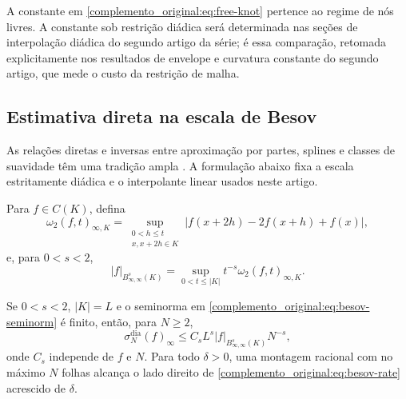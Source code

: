 A constante em \eqref{complemento_original:eq:free-knot} pertence ao regime de nós livres. A
constante sob restrição diádica será determinada nas seções de interpolação diádica do segundo artigo da série; é essa comparação, retomada explicitamente nos resultados de envelope e curvatura constante do segundo artigo, que mede o
custo da restrição de malha.

\subsection{Estimativa direta na escala de Besov}

As relações diretas e inversas entre aproximação por partes, splines e classes
de suavidade têm uma tradição ampla
\citep{artigo_2-birman1967,artigo_2-petrushev1988,artigo_2-devorepopov1988}. A formulação abaixo fixa a
escala estritamente diádica e o interpolante linear usados neste artigo.

Para $f\in C(K)$, defina
\begin{equation}
 \omega_2(f,t)_{\infty,K}
 =\sup_{\substack{0<h\le t\\x,x+2h\in K}}
 |f(x+2h)-2f(x+h)+f(x)|,
\end{equation}
e, para $0<s<2$,
\begin{equation}
 |f|_{B^s_{\infty,\infty}(K)}
 =\sup_{0<t\le|K|}t^{-s}\omega_2(f,t)_{\infty,K}.
 \label{complemento_original:eq:besov-seminorm}
\end{equation}

\begin{theorem}\label{map:complemento_original:6.3}\label{complemento_original:thm:besov}
Se $0<s<2$, $|K|=L$ e o seminorma em \eqref{complemento_original:eq:besov-seminorm} é finito, então, para $N\ge2$,
\begin{equation}
 \sigma_N^{\mathrm{dia}}(f)_\infty
 \le C_sL^s|f|_{B^s_{\infty,\infty}(K)}N^{-s},
 \label{complemento_original:eq:besov-rate}
\end{equation}
onde $C_s$ independe de $f$ e $N$. Para todo $\delta>0$, uma montagem racional com no máximo $N$ folhas alcança o lado direito de \eqref{complemento_original:eq:besov-rate} acrescido de $\delta$.
\end{theorem}

